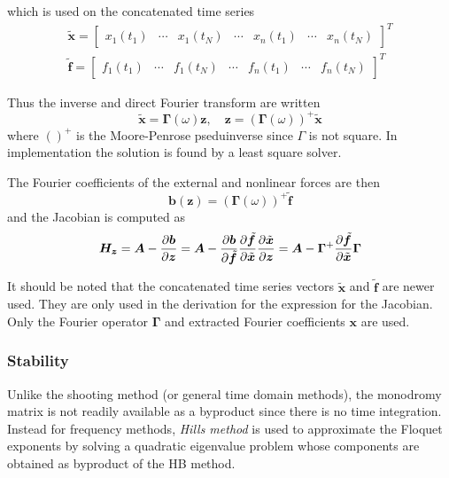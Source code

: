 which is used on the concatenated time series
\begin{equation}
  \label{eq:hb_time_series}
  \begin{aligned}
    \tilde{\bm x} =
    \begin{bmatrix}
      x_1(t_1) & \cdots & x_1(t_N) & \cdots & x_n(t_1) & \cdots & x_n(t_N)
    \end{bmatrix}^T\\
    \tilde{\bm f} =
    \begin{bmatrix}
      f_1(t_1) & \cdots & f_1(t_N) & \cdots & f_n(t_1) & \cdots & f_n(t_N)
    \end{bmatrix}^T
  \end{aligned}
\end{equation}

Thus the inverse and direct Fourier transform are written
\begin{equation}
  \label{eq:hb_four_transform}
    \tilde{\bm x} = \bm \Gamma(\omega) \bm z, \quad
    \bm z =( \bm \Gamma(\omega))^+ \tilde{\bm x}
\end{equation}
where $()^+$ is the Moore-Penrose pseduinverse since $\Gamma$ is not square. In
implementation the solution is found by a least square solver.

The Fourier coefficients of the external and nonlinear forces are then
\begin{equation}
  \label{eq:hb_b_coeff}
  \bm b(\bm z) = ( \bm \Gamma(\omega))^+ \tilde{\bm f}
\end{equation}
and the Jacobian is computed as
\begin{equation}
  \label{eq:hb_jac}
  \bm H_{\bm z} = \bm A - \frac{\partial \bm b}{\partial \bm z} =
  \bm A -
  \frac{\partial\bm b}{\partial \tilde{\bm f}}
  \frac{\partial \tilde{\bm f}}{\partial \tilde{\bm x}}
  \frac{\partial \tilde{\bm x}}{\partial \bm z} =
  \bm A - \bm \Gamma^+ \frac{\partial \tilde{\bm f}}{\partial \tilde{\bm x}} \bm \Gamma
\end{equation}

It should be noted that the concatenated time series vectors $\tilde{\bm x}$ and
$\tilde{\bm f}$ are newer used. They are only used in the derivation for the
expression for the Jacobian. Only the Fourier operator $\bm \Gamma$ and
extracted Fourier coefficients $\bm x$ are used.


\subsubsection{Stability}
\label{sec:hb_stab}

Unlike the shooting method (or general time domain methods), the monodromy
matrix is not readily available as a byproduct since there is no time
integration. Instead for frequency methods, \textit{Hills method} is used to
approximate the Floquet exponents by solving a quadratic eigenvalue problem
whose components are obtained as byproduct of the HB method.


